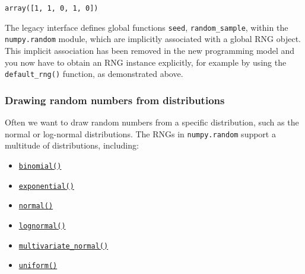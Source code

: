 \documentclass{scrartcl}
\makeatletter
\providecommand{\tightlist}{%
      \setlength{\itemsep}{0pt}\setlength{\parskip}{0pt}}
\newcommand{\boxspacing}{\kern\kvtcb@left@rule\kern\kvtcb@boxsep}
\newcommand{\prompt}[4]{
        {\ttfamily\llap{{\color{#2}[#3]:\hspace{3pt}#4}}\vspace{-\baselineskip}}
    }
\makeatother
\begin{document}
            \begin{tcolorbox}[breakable, size=fbox, boxrule=.5pt, pad at break*=1mm, opacityfill=0]
\prompt{Out}{outcolor}{11}{\boxspacing}
\begin{Verbatim}[commandchars=\\\{\}]
array([1, 1, 0, 1, 0])
\end{Verbatim}
\end{tcolorbox}
        
    The legacy interface defines global functions \texttt{seed},
\texttt{random\_sample}, \etc within the \texttt{numpy.random} module,
which are implicitly associated with a global RNG object. This implicit
association has been removed in the new programming model and you now
have to obtain an RNG instance explicitly, for example by using the
\texttt{default\_rng()} function, as demonstrated above.

    \hypertarget{drawing-random-numbers-from-distributions}{%
\subsubsection{Drawing random numbers from
distributions}\label{drawing-random-numbers-from-distributions}}

Often we want to draw random numbers from a specific distribution, such
as the normal or log-normal distributions. The RNGs in
\texttt{numpy.random} support a multitude of distributions, including:

\begin{itemize}
\tightlist
\item
  \href{https://numpy.org/doc/stable/reference/random/generated/numpy.random.RandomState.binomial.html}{\texttt{binomial()}}
\item
  \href{https://numpy.org/doc/stable/reference/random/generated/numpy.random.RandomState.exponential.html}{\texttt{exponential()}}
\item
  \href{https://numpy.org/doc/stable/reference/random/generated/numpy.random.RandomState.normal.html}{\texttt{normal()}}
\item
  \href{https://numpy.org/doc/stable/reference/random/generated/numpy.random.RandomState.lognormal.html}{\texttt{lognormal()}}
\item
  \href{https://numpy.org/doc/stable/reference/random/generated/numpy.random.RandomState.multivariate_normal.html}{\texttt{multivariate\_normal()}}
\item
  \href{https://numpy.org/doc/stable/reference/random/generated/numpy.random.RandomState.uniform.html}{\texttt{uniform()}}
\end{itemize}
\end{document}
